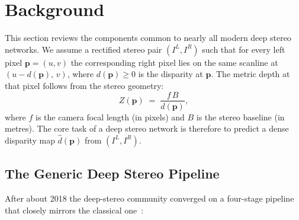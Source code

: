 \section{Background}
\label{sec:background}

This section reviews the components common to nearly all modern deep stereo networks. We assume a rectified stereo pair $(I^L, I^R)$ such that for every left pixel $\mathbf{p} = (u, v)$ the corresponding right pixel lies on the same scanline at $(u - d(\mathbf{p}),\, v)$, where $d(\mathbf{p}) \ge 0$ is the disparity at $\mathbf{p}$. The metric depth at that pixel follows from the stereo geometry:
\begin{equation}
Z(\mathbf{p}) \;=\; \frac{f \, B}{d(\mathbf{p})},
\label{eq:depth}
\end{equation}
where $f$ is the camera focal length (in pixels) and $B$ is the stereo baseline (in metres). The core task of a deep stereo network is therefore to predict a dense disparity map $\hat{d}(\mathbf{p})$ from $(I^L, I^R)$.

\subsection{The Generic Deep Stereo Pipeline}

After about 2018 the deep-stereo community converged on a four-stage pipeline that closely mirrors the classical one~\cite{scharstein2002taxonomy}:

